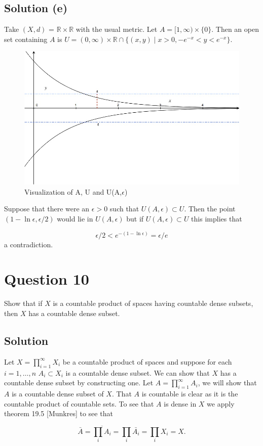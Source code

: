 \documentclass[11pt, oneside]{article}   	%
\newcommand{\R}{\mathbb{R}}
\newcommand{\st}{\mid}
\newcommand{\set}[1]{\{ #1 \}}
\begin{document}
\subsection*{Solution (e)}
Take $(X,d)$ = $\R \times \R$ with the usual metric. Let $A = [1,\infty) \times \set{0}$. Then an open set containing $A$ is $U = (0,\infty) \times \R \cap \set{(x,y) \st x>0, -e^{-x} < y < e^{-x}}$. 

\begin{figure}[h]
\caption{Visualization of A, U and U(A,$\epsilon$)}
\centering
\includegraphics[scale=.5]{graph}
\end{figure}

Suppose that there were an $\epsilon > 0$ such that $U(A,\epsilon) \subset U$. Then the point $(1-\ln{\epsilon}, \epsilon / 2)$ would lie in $U(A,\epsilon)$ but if $U(A,\epsilon) \subset U$ this implies that

\begin{equation*}
\epsilon/2 < e^{-(1-\ln{\epsilon})} = \epsilon/e 
\end{equation*}
a contradiction.

\section*{Question 10}

Show that if $X$ is a countable product of spaces having countable dense subsets, then $X$ has a countable dense subset.

\subsection*{Solution}

Let $X = \prod_{i=1}^\infty X_i$ be a countable product of spaces and suppose for each $i = 1, \dots, n$ $A_i \subset X_i$ is a countable dense subset. We can show that $X$ has a countable dense subset by constructing one. Let $A = \prod_{i=1}^\infty A_i$, we will show that $A$ is a countable dense subset of $X$. That $A$ is countable is clear as it is the countable product of countable sets. To see that $A$ is dense in $X$ we apply theorem 19.5 [Munkres] to see that

\begin{equation*}
\bar{A} = \overline{\prod_iA_i} = \prod_i \bar{A_i} = \prod_i X_i = X.
\end{equation*}
\end{document}
